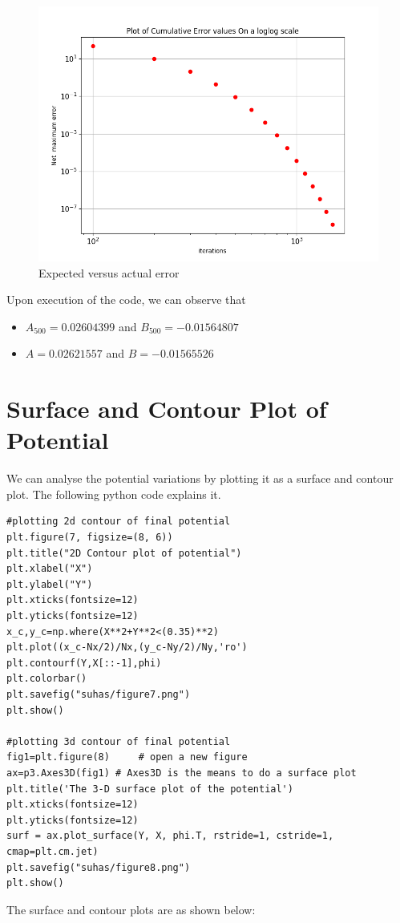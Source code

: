 \documentclass[11pt, a4paper]{article}
\begin{document}
\begin{figure}[!tbh]
 \centering
 \includegraphics[scale=0.7]{Figure6.png}  
 \caption{Expected versus actual error}
\end{figure}

\newpage
Upon execution of the code, we can observe that 
\begin{itemize}
\item
$ A_{500} = 0.02604399$ and $B_{500} = -0.01564807 $ 

\item
$A = 0.02621557$ and $B = -0.01565526$

\end{itemize}


\section{Surface and Contour Plot of Potential}

We can analyse the potential variations by plotting it as a surface and contour plot. The following python code explains it. 
\begin{verbatim}
#plotting 2d contour of final potential
plt.figure(7, figsize=(8, 6))
plt.title("2D Contour plot of potential")
plt.xlabel("X")
plt.ylabel("Y")
plt.xticks(fontsize=12)
plt.yticks(fontsize=12)
x_c,y_c=np.where(X**2+Y**2<(0.35)**2)
plt.plot((x_c-Nx/2)/Nx,(y_c-Ny/2)/Ny,'ro')
plt.contourf(Y,X[::-1],phi)
plt.colorbar()
plt.savefig("suhas/figure7.png")
plt.show()

#plotting 3d contour of final potential
fig1=plt.figure(8)     # open a new figure
ax=p3.Axes3D(fig1) # Axes3D is the means to do a surface plot
plt.title('The 3-D surface plot of the potential')
plt.xticks(fontsize=12)
plt.yticks(fontsize=12)
surf = ax.plot_surface(Y, X, phi.T, rstride=1, cstride=1, cmap=plt.cm.jet)
plt.savefig("suhas/figure8.png")
plt.show()
  \end{verbatim}
\newpage
The surface and contour plots are as shown below:
\end{document}
